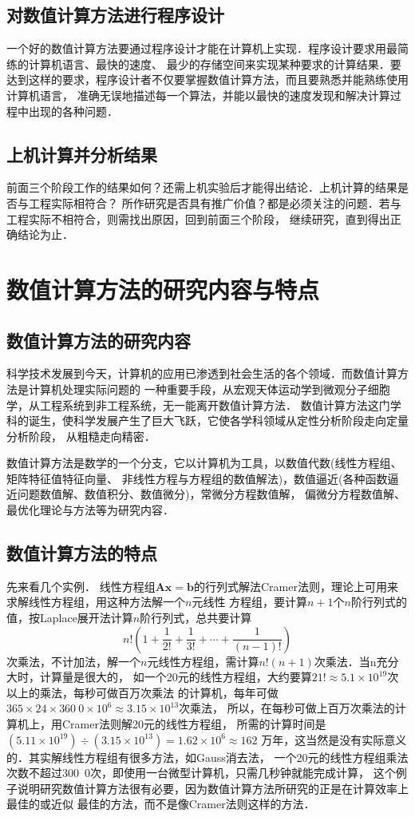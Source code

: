 \subsection{对数值计算方法进行程序设计}
一个好的数值计算方法要通过程序设计才能在计算机上实现．程序设计要求用最简练的计算机语言、最快的速度、
最少的存储空间来实现某种要求的计算结果．要达到这样的要求，程序设计者不仅要掌握数值计算方法，而且要熟悉并能熟练使用计算机语言，
准确无误地描述每一个算法，并能以最快的速度发现和解决计算过程中出现的各种问题．
\subsection{上机计算并分析结果}
前面三个阶段工作的结果如何？还需上机实验后才能得出结论．上机计算的结果是否与工程实际相符合？
所作研究是否具有推广价值？都是必须关注的问题．若与工程实际不相符合，则需找出原因，回到前面三个阶段，
继续研究，直到得出正确结论为止．
\section{数值计算方法的研究内容与特点}
\subsection{数值计算方法的研究内容}
科学技术发展到今天，计算机的应用已渗透到社会生活的各个领域．而数值计算方法是计算机处理实际问题的
一种重要手段，从宏观天体运动学到微观分子细胞学，从工程系统到非工程系统，无一能离开数值计算方法．
数值计算方法这门学科的诞生，使科学发展产生了巨大飞跃，它使各学科领域从定性分析阶段走向定量分析阶段，
从粗糙走向精密．

数值计算方法是数学的一个分支，它以计算机为工具，以数值代数(线性方程组、矩阵特征值特征向量、
非线性方程与方程组的数值解法)，数值逼近(各种函数逼近问题数值解、数值积分、数值微分)，常微分方程数值解，
偏微分方程数值解、最优化理论与方法等为研究内容．

\subsection{数值计算方法的特点}
先来看几个实例．
\exam
线性方程组$\bm{Ax}=\bm{b}$的行列式解法Cramer法则，理论上可用来求解线性方程组，用这种方法解一个$n$元线性
方程组，要计算$n+1$个$n$阶行列式的值，按Laplace展开法计算$n$阶行列式，总共要计算
$$n!\left(1+\frac{1}{2!}+\frac{1}{3!}+\cdots+\frac{1}{(n-1)!}\right)$$
次乘法，不计加法，解一个$n$元线性方程组，需计算$n!(n+1)$次乘法．当n充分大时，计算量是很大的，
如一个20元的线性方程组，大约要算$21!\approx5.1\times10^{19}$次以上的乘法，每秒可做百万次乘法
的计算机，每年可做$365\times24\times360\ 0\times10^6\approx3.15\times10^{13}$次乘法，
所以，在每秒可做上百万次乘法的计算机上，用Cramer法则解20元的线性方程组，
所需的计算时间是$(5.11\times10^{19})\div(3.15\times10^{13})=1.62\times10^{6}\approx162$
万年，这当然是没有实际意义的．其实解线性方程组有很多方法，如Gauss消去法，
一个20元的线性方程组乘法次数不超过300\ 0次，即使用一台微型计算机，只需几秒钟就能完成计算，
这个例子说明研究数值计算方法很有必要，因为数值计算方法所研究的正是在计算效率上最佳的或近似
最佳的方法，而不是像Cramer法则这样的方法．

